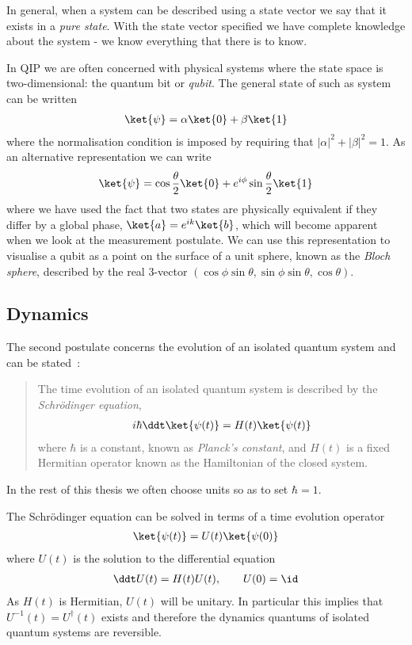 In general, when a system can be described using a state vector we say that it exists in a \textit{pure state}. With the state vector specified we have complete knowledge about the system - we know everything that there is to know.

In QIP we are often concerned with physical systems where the state space is two-dimensional: the quantum bit or \textit{qubit}. The general state of such as system can be written
\begin{align}
  \ket{\psi} = \alpha\ket{0} + \beta\ket{1}
\end{align}
where the normalisation condition is imposed by requiring that $|\alpha|^2 + |\beta|^2 = 1$. As an alternative representation we can write
\begin{align}
  \ket{\psi} = \cos\frac{\theta}{2}\ket{0} + e^{i\phi}\sin\frac{\theta}{2}\ket{1}
\end{align}
where we have used the fact that two states are physically equivalent if they differ by a global phase, $\ket{a} = e^{ik}\ket{b}$, which will become apparent when we look at the measurement postulate. We can use this representation to visualise a qubit as a point on the surface of a unit sphere, known as the \textit{Bloch sphere}, described by the real $3$-vector $(\cos\phi\sin\theta, \sin\phi\sin\theta, \cos\theta)$.

\subsection{Dynamics}

The second postulate concerns the evolution of an isolated quantum system and can be stated~\cite{nielsen+chuang}:
\begin{quotation}
The time evolution of an isolated quantum system is described by the \textit{Schr\"odinger equation},
\begin{align}
  \label{qd:schrodinger_eq}
  i\hbar\ddt \ket{\psi(t)} = H(t) \ket{\psi(t)}
\end{align}
where $\hbar$ is a constant, known as \textit{Planck's constant}, and $H(t)$ is a fixed Hermitian operator known as the Hamiltonian of the closed system.
\end{quotation}
In the rest of this thesis we often choose units so as to set $\hbar = 1$. 

The Schr\"odinger equation can be solved in terms of a time evolution operator
\begin{align}
  \ket{\psi(t)} = U(t)\ket{\psi(0)}
\end{align}
where $U(t)$ is the solution to the differential equation
\begin{align}
  \ddt U(t) = H(t)U(t), \qquad U(0) = \id
\end{align}
As $H(t)$ is Hermitian, $U(t)$ will be unitary. In particular this implies that $U^{-1}(t) = U^\dagger(t)$ exists and therefore the dynamics quantums of isolated quantum systems are reversible.

